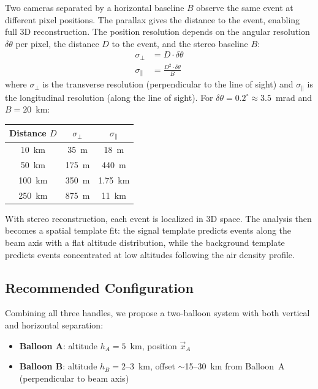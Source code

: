 \documentclass[11pt]{article}
\begin{document}
Two cameras separated by a horizontal baseline $B$ observe the same
event at different pixel positions.  The parallax gives the distance to
the event, enabling full 3D reconstruction.  The position resolution
depends on the angular resolution $\delta\theta$ per pixel, the
distance $D$ to the event, and the stereo baseline $B$:
\begin{align}
  \sigma_\perp &= D \cdot \delta\theta
  \label{eq:sigma_perp} \\
  \sigma_\parallel &= \frac{D^2 \cdot \delta\theta}{B}
  \label{eq:sigma_par}
\end{align}
where $\sigma_\perp$ is the transverse resolution (perpendicular to
the line of sight) and $\sigma_\parallel$ is the longitudinal
resolution (along the line of sight).  For $\delta\theta = 0.2^\circ
\approx 3.5$~mrad and $B = 20$~km:

\begin{center}
\begin{tabular}{ccc}
\toprule
\textbf{Distance $D$} & $\sigma_\perp$ & $\sigma_\parallel$ \\
\midrule
10~km  & 35~m   & 18~m \\
50~km  & 175~m  & 440~m \\
100~km & 350~m  & 1.75~km \\
250~km & 875~m  & 11~km \\
\bottomrule
\end{tabular}
\end{center}

With stereo reconstruction, each event is localized in 3D space.
The analysis then becomes a spatial template fit: the signal
template predicts events along the beam axis with a flat altitude
distribution, while the background template predicts events
concentrated at low altitudes following the air density profile.


\subsection{Recommended Configuration}

Combining all three handles, we propose a two-balloon system with
both vertical and horizontal separation:
\begin{itemize}[nosep]
  \item \textbf{Balloon A}: altitude $h_A = 5$~km, position
        $\vec{x}_A$
  \item \textbf{Balloon B}: altitude $h_B = 2\text{--}3$~km, offset
        $\sim$15--30~km from Balloon~A (perpendicular to beam axis)
\end{itemize}
\end{document}
